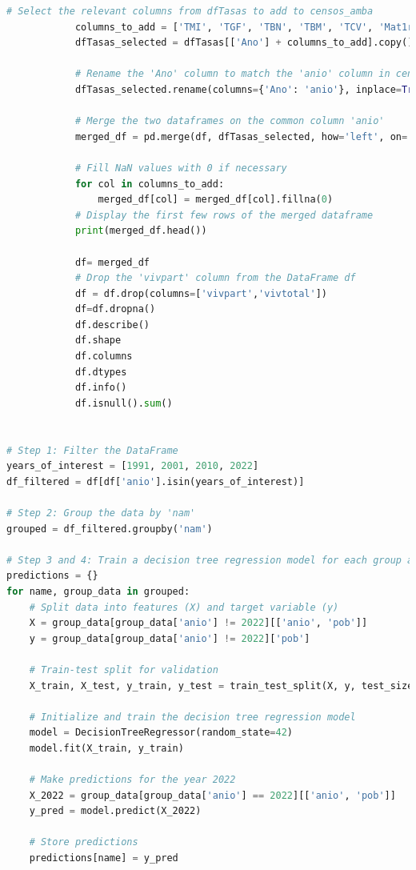 \documentclass{article}
\theoremstyle{mytheoremstyle}
\theoremstyle{mytheoremstyle}
\theoremstyle{myproblemstyle}
\begin{document}
\begin{lstlisting}[language=Python, caption=RegTrees.ipynb,label={lst:LR.ipynb}]
            # Select the relevant columns from dfTasas to add to censos_amba
            columns_to_add = ['TMI', 'TGF', 'TBN', 'TBM', 'TCV', 'Mat1ria']
            dfTasas_selected = dfTasas[['Ano'] + columns_to_add].copy()
            
            # Rename the 'Ano' column to match the 'anio' column in censos_amba
            dfTasas_selected.rename(columns={'Ano': 'anio'}, inplace=True)
            
            # Merge the two dataframes on the common column 'anio'
            merged_df = pd.merge(df, dfTasas_selected, how='left', on='anio')
            
            # Fill NaN values with 0 if necessary
            for col in columns_to_add:
                merged_df[col] = merged_df[col].fillna(0)
            # Display the first few rows of the merged dataframe
            print(merged_df.head())                      

            df= merged_df
            # Drop the 'vivpart' column from the DataFrame df
            df = df.drop(columns=['vivpart','vivtotal'])
            df=df.dropna()
            df.describe()
            df.shape
            df.columns
            df.dtypes
            df.info()
            df.isnull().sum()

            
# Step 1: Filter the DataFrame
years_of_interest = [1991, 2001, 2010, 2022]
df_filtered = df[df['anio'].isin(years_of_interest)]

# Step 2: Group the data by 'nam'
grouped = df_filtered.groupby('nam')

# Step 3 and 4: Train a decision tree regression model for each group and make predictions
predictions = {}
for name, group_data in grouped:
    # Split data into features (X) and target variable (y)
    X = group_data[group_data['anio'] != 2022][['anio', 'pob']]
    y = group_data[group_data['anio'] != 2022]['pob']
    
    # Train-test split for validation
    X_train, X_test, y_train, y_test = train_test_split(X, y, test_size=0.2, random_state=42)
    
    # Initialize and train the decision tree regression model
    model = DecisionTreeRegressor(random_state=42)
    model.fit(X_train, y_train)
    
    # Make predictions for the year 2022
    X_2022 = group_data[group_data['anio'] == 2022][['anio', 'pob']]
    y_pred = model.predict(X_2022)
    
    # Store predictions
    predictions[name] = y_pred


\end{lstlisting}
\end{document}
